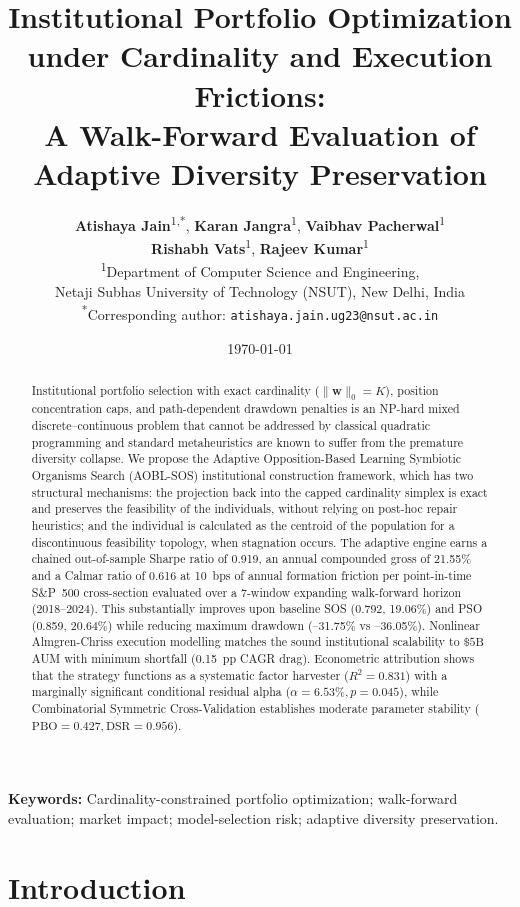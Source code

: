 \documentclass[11pt,a4paper]{article}
\title{\textbf{Institutional Portfolio Optimization under Cardinality and Execution Frictions:\\A Walk-Forward Evaluation of Adaptive Diversity Preservation}}
\author{
    \textbf{Atishaya Jain}\textsuperscript{1,*}, \quad
    \textbf{Karan Jangra}\textsuperscript{1}, \quad
    \textbf{Vaibhav Pacherwal}\textsuperscript{1}\\[0.3em]
    \textbf{Rishabh Vats}\textsuperscript{1}, \quad
    \textbf{Rajeev Kumar}\textsuperscript{1}\\[0.5em]
    \small \textsuperscript{1}Department of Computer Science and Engineering,\\
    \small Netaji Subhas University of Technology (NSUT), New Delhi, India\\[0.3em]
    \small \textsuperscript{*}Corresponding author: \texttt{atishaya.jain.ug23@nsut.ac.in}
}
\date{\today}
\begin{document}
\maketitle
\linenumbers

\begin{abstract}
Institutional portfolio selection with exact cardinality ($\|\mathbf{w}\|_0 = K$), position concentration caps, and path-dependent drawdown penalties is an NP-hard mixed discrete–continuous problem that cannot be addressed by classical quadratic programming and standard metaheuristics are known to suffer from the premature diversity collapse. We propose the Adaptive Opposition-Based Learning Symbiotic Organisms Search (AOBL-SOS) institutional construction framework, which has two structural mechanisms: the projection back into the capped cardinality simplex is exact and preserves the feasibility of the individuals, without relying on post-hoc repair heuristics; and the individual is calculated as the centroid of the population for a discontinuous feasibility topology, when stagnation occurs. The adaptive engine earns a chained out-of-sample Sharpe ratio of 0.919, an annual compounded gross of 21.55\% and a Calmar ratio of 0.616 at 10~bps of annual formation friction per point-in-time S\&P~500 cross-section evaluated over a 7-window expanding walk-forward horizon (2018--2024). This substantially improves upon baseline SOS (0.792, 19.06\%) and PSO (0.859, 20.64\%) while reducing maximum drawdown (--31.75\% vs --36.05\%). Nonlinear Almgren-Chriss execution modelling matches the sound institutional scalability to $\$5\text{B}$ AUM with minimum shortfall (0.15~pp CAGR drag). Econometric attribution shows that the strategy functions as a systematic factor harvester ($R^2 = 0.831$) with a marginally significant conditional residual alpha ($\alpha = 6.53\%, p=0.045$), while Combinatorial Symmetric Cross-Validation establishes moderate parameter stability ($\text{PBO} = 0.427, \text{DSR} = 0.956$).
\end{abstract}

\noindent \textbf{Keywords:} Cardinality-constrained portfolio optimization; walk-forward evaluation; market impact; model-selection risk; adaptive diversity preservation.

\section{Introduction}
\end{document}

